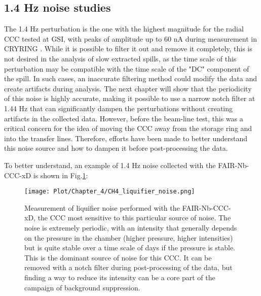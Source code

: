 \documentclass[12pt,a4paper]{report}
\begin{document}
        \subsection{1.4 Hz noise studies}
        The 1.4 Hz perturbation is the one with the highest magnitude for the radial CCC tested at GSI, with peaks of amplitude up to 60 nA during measurement in CRYRING \cite{DavidThesis}. While it is possible to filter it out and remove it completely, this is not desired in the analysis of slow extracted spills, as the time scale of this perturbation may be compatible with the time scale of the "DC" component of the spill. In such cases, an inaccurate filtering method could modify the data and create artifacts during analysis. The next chapter will show that the periodicity of this noise is highly accurate, making it possible to use a narrow notch filter at 1.44 Hz that can significantly dampen the perturbations without creating artifacts in the collected data. However, before the beam-line test, this was a critical concern for the idea of moving the CCC away from the storage ring and into the transfer lines. Therefore, efforts have been made to better understand this noise source and how to dampen it before post-processing the data.
        
        To better understand, an example of 1.4 Hz noise collected with the FAIR-Nb-CCC-xD is shown in Fig.\ref{CH4_1.4Hz_noise}:
        \begin{figure}[H]
        	\centering
        	\texttt{[image: Plot/Chapter\_4/CH4\_liquifier\_noise.png]}
        	\caption{\small{Measurement of liquifier noise performed with the FAIR-Nb-CCC-xD, the CCC most sensitive to this particular source of noise. The noise is extremely periodic, with an intensity that generally depends on the pressure in the chamber (higher pressure, higher intensities) but is quite stable over a time scale of days if the pressure is stable. This is the dominant source of noise for this CCC. It can be removed with a notch filter during post-processing of the data, but finding a way to reduce its intensity can be a core part of the campaign of background suppression.}}
        	\label{CH4_1.4Hz_noise}
        \end{figure}
        
\end{document}
